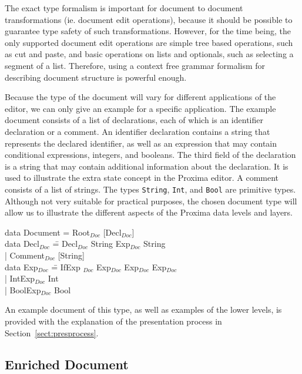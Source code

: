 The exact type formalism is important for document to document transformations (ie. document edit operations), because it should be possible to guarantee type safety of such transformations. However, for the time being, the only supported document edit operations are simple tree based operations, such as cut and paste, and basic operations on lists and optionals, such as selecting a segment of a list. Therefore, using a context free grammar formalism for describing document structure is powerful enough.
 
Because the type of the document will vary for different applications of the editor, we can only give an example for a specific application. The example document consists of a list of declarations, each of which is an identifier declaration or a comment. An identifier declaration contains a string that represents the declared identifier, as well as an expression that may contain conditional expressions, integers, and booleans. The third field of the declaration is a string that may contain additional information about the declaration. It is used to illustrate the extra state concept in the Proxima editor. A comment consists of a list of strings. The types {\tt String}, {\tt Int}, and {\tt Bool} are primitive types. Although not very suitable for practical purposes, the chosen document type will allow us to illustrate the different aspects of the Proxima data levels and layers.

\noindent
\ttfamily
\begin{tabbing}
data Document = Root$_{Doc}$ [Decl$_{Doc}$]\\
data Decl$_{Doc}$ \= = Decl$_{Doc}$ String Exp$_{Doc}$ String\\
                            \> | Comment$_{Doc}$ [String]\\
data Exp$_{Doc}$ \= =  IfExp $_{Doc}$ Exp$_{Doc}$ Exp$_{Doc}$ Exp$_{Doc}$\\
                 \> | IntExp$_{Doc}$ Int\\
                 \> | BoolExp$_{Doc}$ Bool\\
\end{tabbing}
\rmfamily

An example document of this type, as well as examples of the lower levels, is provided with the explanation of the presentation process in Section~\ref{sect:presprocess}.


%																
\subsection{Enriched Document} \label{sect:enrLevel}

